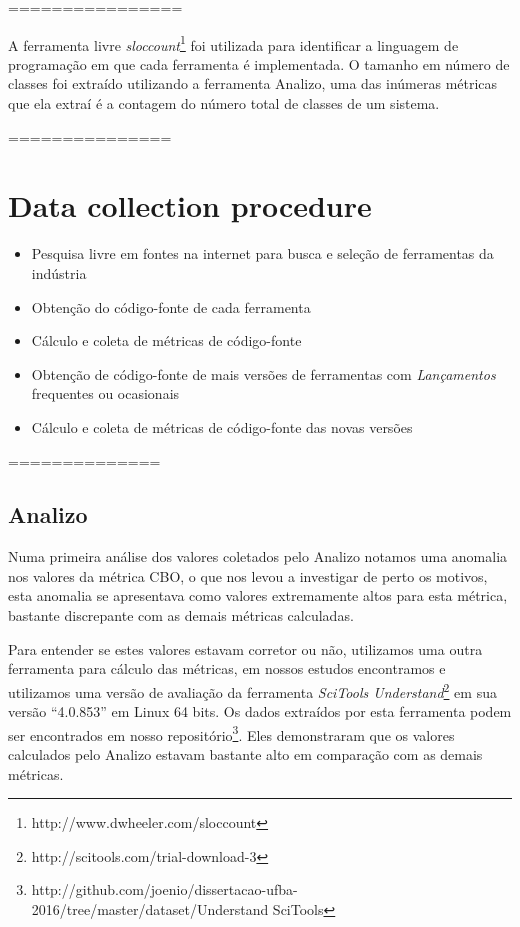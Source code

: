 ================


A ferramenta livre {\it sloccount}\footnote{http://www.dwheeler.com/sloccount}
foi utilizada para identificar a linguagem de programação em que cada
ferramenta é implementada. O tamanho em número de classes foi extraído utilizando a ferramenta
Analizo, uma das inúmeras métricas que ela extraí é a contagem do número total
de classes de um sistema. 

===============

\section{Data collection procedure}

\begin{itemize}
  \item Pesquisa livre em fontes na internet para busca e seleção de ferramentas da indústria
  \item Obtenção do código-fonte de cada ferramenta
  \item Cálculo e coleta de métricas de código-fonte
  \item Obtenção de código-fonte de mais versões de ferramentas com {\it Lançamentos} frequentes ou ocasionais
  \item Cálculo e coleta de métricas de código-fonte das novas versões
\end{itemize}

==============

\subsection{Analizo}

Numa primeira análise dos valores coletados pelo Analizo notamos uma anomalia
nos valores da métrica CBO, o que nos levou a investigar de perto os motivos,
esta anomalia se apresentava como valores extremamente altos para esta métrica,
bastante discrepante com as demais métricas calculadas.

Para entender se estes valores estavam corretor ou não, utilizamos uma outra
ferramenta para cálculo das métricas, em nossos estudos encontramos e
utilizamos uma versão de avaliação da ferramenta {\it SciTools
Understand}\footnote{http://scitools.com/trial-download-3} em sua versão
``4.0.853'' em Linux 64 bits. Os dados extraídos por esta ferramenta podem ser
encontrados em nosso
repositório\footnote{http://github.com/joenio/dissertacao-ufba-2016/tree/master/dataset/Understand
SciTools}. Eles demonstraram que os valores calculados pelo Analizo estavam
bastante alto em comparação com as demais métricas.

